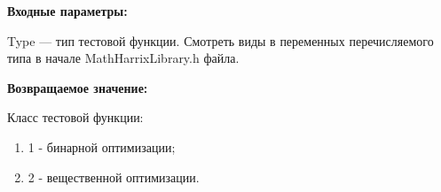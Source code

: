\textbf{Входные параметры:}

Type --- тип тестовой функции. Смотреть виды в переменных перечисляемого типа в начале MathHarrixLibrary.h файла.

\textbf{Возвращаемое значение:}

Класс тестовой функции:

\begin{enumerate}
\item 1 - бинарной оптимизации;
\item 2 - вещественной оптимизации.
\end{enumerate}